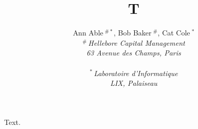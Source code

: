 \documentclass[conference]{IEEEtran}
\title{T}
\author{{Ann Able{\small $~^{\#*}$}, Bob Baker{\small $~^{\#}$}, Cat Cole{\small $~^{*}$} }
{}\vspace{1.6mm}\\ \fontsize{10}{10}\selectfont\itshape
$^{\#}$\,Hellebore Capital Management\\ 63 Avenue des Champs, Paris\\ \,\\
$^{*}$\,Laboratoire d'Informatique\\ LIX, Palaiseau\\}
\begin{document}
\maketitle
Text.
\end{document}
